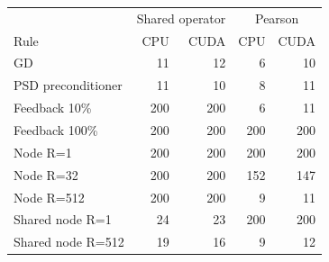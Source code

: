 \begin{tabular}{lrrrr}
\hline
& \multicolumn{2}{c}{Shared operator} & \multicolumn{2}{c}{Pearson}\\
Rule & CPU & CUDA & CPU & CUDA\\
\hline
GD & 11 & 12 & 6 & 10\\
PSD preconditioner & 11 & 10 & 8 & 11\\
Feedback 10\% & 200 & 200 & 6 & 11\\
Feedback 100\% & 200 & 200 & 200 & 200\\
Node R=1 & 200 & 200 & 200 & 200\\
Node R=32 & 200 & 200 & 152 & 147\\
Node R=512 & 200 & 200 & 9 & 11\\
Shared node R=1 & 24 & 23 & 200 & 200\\
Shared node R=512 & 19 & 16 & 9 & 12\\
\hline
\end{tabular}
